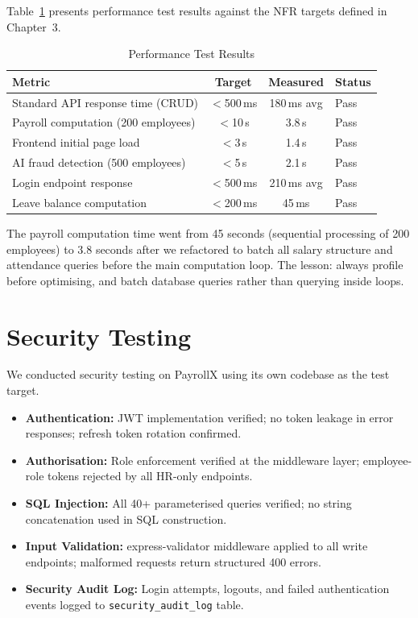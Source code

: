\documentclass[12pt,a4paper]{report}
\begin{document}
Table~\ref{tab:performance_tests} presents performance test results against the NFR targets defined in Chapter~3.

\begin{table}[H]
\centering
\caption{Performance Test Results}
\label{tab:performance_tests}
\begin{tabular}{|l|c|c|l|}
\hline
\textbf{Metric} & \textbf{Target} & \textbf{Measured} & \textbf{Status} \\
\hline
Standard API response time (CRUD) & $<$500\,ms  & 180\,ms avg  & Pass \\
\hline
Payroll computation (200 employees) & $<$10\,s    & 3.8\,s       & Pass \\
\hline
Frontend initial page load          & $<$3\,s     & 1.4\,s       & Pass \\
\hline
AI fraud detection (500 employees)  & $<$5\,s     & 2.1\,s       & Pass \\
\hline
Login endpoint response             & $<$500\,ms  & 210\,ms avg  & Pass \\
\hline
Leave balance computation           & $<$200\,ms  & 45\,ms       & Pass \\
\hline
\end{tabular}
\end{table}

\begin{lessonbox}
The payroll computation time went from 45 seconds (sequential processing of 200 employees) to 3.8 seconds after we refactored to batch all salary structure and attendance queries before the main computation loop. The lesson: always profile before optimising, and batch database queries rather than querying inside loops.
\end{lessonbox}

\section{Security Testing}

We conducted security testing on PayrollX using its own codebase as the test target.

\begin{itemize}
    \item \textbf{Authentication:} JWT implementation verified; no token leakage in error responses; refresh token rotation confirmed.
    \item \textbf{Authorisation:} Role enforcement verified at the middleware layer; employee-role tokens rejected by all HR-only endpoints.
    \item \textbf{SQL Injection:} All 40+ parameterised queries verified; no string concatenation used in SQL construction.
    \item \textbf{Input Validation:} express-validator middleware applied to all write endpoints; malformed requests return structured 400 errors.
    \item \textbf{Security Audit Log:} Login attempts, logouts, and failed authentication events logged to \texttt{security\_audit\_log} table.
\end{itemize}
\end{document}
